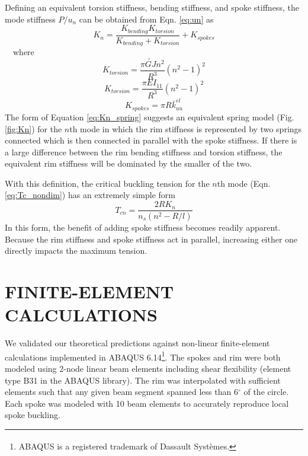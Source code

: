 \documentclass{bmd2016p}
\begin{document}
Defining an equivalent torsion stiffness, bending stiffness, and spoke stiffness, the mode stiffness $P/u_n$ can be obtained from Eqn. \ref{eq:un} as
	\begin{equation}\label{eq:Kn_spring}
	K_n = \frac{K_{bending}K_{torsion}}{K_{bending}+K_{torsion}} + K_{spokes}
	\end{equation}
\,\,\,\, where
	\begin{equation}\label{eq:Ktorsion}
	K_{torsion} = \frac{\pi\widetilde{GJ}n^2}{R^3}(n^2-1)^2
	\end{equation}
	\begin{equation}\label{eq:Kbending}
	K_{torsion} = \frac{\pi EI_{11}}{R^3}(n^2-1)^2
	\end{equation}
	\begin{equation}\label{eq:Kspokes}
	K_{spokes} = \pi R \bar{k}_{uu}^{el}
	\end{equation}
The form of Equation \ref{eq:Kn_spring} suggests an equivalent spring model (Fig. \ref{fig:Kn}) for the $n$th mode in which the rim stiffness is represented by two springs connected which is then connected in parallel with the spoke stiffness. If there is a large difference between the rim bending stiffness and torsion stiffness, the equivalent rim stiffness will be dominated by the smaller of the two.

With this definition, the critical buckling tension for the $n$th mode (Eqn. \ref{eq:Tc_nondim}) has an extremely simple form
	\begin{equation}\label{eq:Tc_Kn}
	T_{cn} = \frac{2RK_n}{n_s(n^2 - R/l)}
	\end{equation}
In this form, the benefit of adding spoke stiffness becomes readily apparent. Because the rim stiffness and spoke stiffness act in parallel, increasing either one directly impacts the maximum tension.




\section{FINITE-ELEMENT CALCULATIONS}
We validated our theoretical predictions against non-linear finite-element calculations implemented in ABAQUS\textsuperscript{\textregistered} 6.14\footnote{ABAQUS\textsuperscript{\textregistered} is a registered trademark of Dassault Syst\`emes.}. The spokes and rim were both modeled using 2-node linear beam elements including shear flexibility (element type B31 in the ABAQUS library). The rim was interpolated with sufficient elements such that any given beam segment spanned less than 6$^{\circ}$ of the circle. Each spoke was modeled with 10 beam elements to accurately reproduce local spoke buckling.
\end{document}
